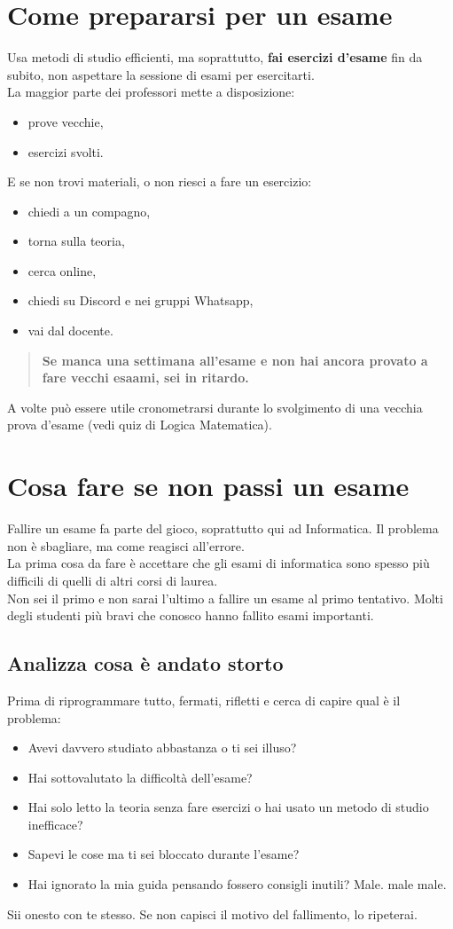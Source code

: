 \documentclass{article}
\begin{document}
\section{Come prepararsi per un esame}
Usa metodi di studio efficienti, ma soprattutto, \textbf{fai esercizi d'esame} fin da subito, non aspettare la sessione di esami per esercitarti.\\
La maggior parte dei professori mette a disposizione:
\begin{itemize}
\item prove vecchie,
\item esercizi svolti.
\end{itemize}
E se non trovi materiali, o non riesci a fare un esercizio:
\begin{itemize}
\item chiedi a un compagno,
\item torna sulla teoria,
\item cerca online,
\item chiedi su Discord e nei gruppi Whatsapp,
\item vai dal docente.
\end{itemize}
\begin{quote}
\textbf{Se manca una settimana all'esame e non hai ancora provato a fare vecchi esaami, sei in ritardo.}
\end{quote}
A volte può essere utile cronometrarsi durante lo svolgimento di una vecchia prova d'esame (vedi quiz di Logica Matematica).


\section{Cosa fare se non passi un esame}
Fallire un esame fa parte del gioco, soprattutto qui ad Informatica. Il problema non è sbagliare, ma come reagisci all'errore.\\
La prima cosa da fare è accettare che gli esami di informatica sono spesso più difficili di quelli di altri corsi di laurea.\\
Non sei il primo e non sarai l'ultimo a fallire un esame al primo tentativo.  
Molti degli studenti più bravi che conosco hanno fallito esami importanti.


\subsection{Analizza cosa è andato storto}
Prima di riprogrammare tutto, fermati, rifletti e cerca di capire qual è il problema:
\begin{itemize}
\item Avevi davvero studiato abbastanza o ti sei illuso?
\item Hai sottovalutato la difficoltà dell'esame?
\item Hai solo letto la teoria senza fare esercizi o hai usato un metodo di studio inefficace?
\item Sapevi le cose ma ti sei bloccato durante l'esame?
\item Hai ignorato la mia guida pensando fossero consigli inutili? Male. male male.
\end{itemize}
Sii onesto con te stesso. Se non capisci il motivo del fallimento, lo ripeterai.
\end{document}
